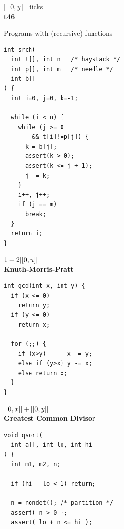 \documentclass[nocopyrightspace,preprint,pldi]{sigplanconf-pldi15}
\begin{document}
{\begin{figure}
\begin{minipage}[b]{\progwidth}
\begin{center}
$|[0, y]|$ ticks
\\[.7\baselineskip]
      {\bf t46}
    \end{center}
  \end{minipage}

   \caption{Programs with (recursive) functions}
  \label{fig:cat3}
\end{figure}

\begin{figure}
 \setlength{\progwidth}{.32\linewidth}
  \centering
%
%
  \begin{minipage}[b]{\progwidth}
    \begin{center}
   \begin{lstlisting}
int srch(
  int t[], int n,  /* haystack */
  int p[], int m,  /* needle */
  int b[]
) {
  int i=0, j=0, k=-1;

  while (i < n) {
    while (j >= 0
        && t[i]!=p[j]) {
      k = b[j];
      assert(k > 0);
      assert(k <= j + 1);
      j -= k;
    }
    i++, j++;
    if (j == m)
      break;
  }
  return i;
}
   \end{lstlisting}

$1 + 2|[0,n]|$
\\[.7\baselineskip]
      {\bf Knuth-Morris-Pratt}
    \end{center}
  \end{minipage}
%
%
  \begin{minipage}[b]{\progwidth}
    \begin{center}
   \begin{lstlisting}
int gcd(int x, int y) {
  if (x <= 0)
    return y;
  if (y <= 0)
    return x;

  for (;;) {
    if (x>y)      x -= y;
    else if (y>x) y -= x;
    else return x;
  }
}
   \end{lstlisting}

$|[0,x]| + |[0,y]|$
\\[.7\baselineskip]
      {\bf Greatest Common Divisor}
    \end{center}
  \end{minipage}
%
%
  \begin{minipage}[b]{\progwidth}
    \begin{center}
   \begin{lstlisting}
void qsort(
  int a[], int lo, int hi
) {
  int m1, m2, n;

  if (hi - lo < 1) return;

  n = nondet(); /* partition */
  assert( n > 0 );
  assert( lo + n <= hi );


\end{lstlisting}
\end{center}
\end{minipage}
\end{figure}}
\end{document}
